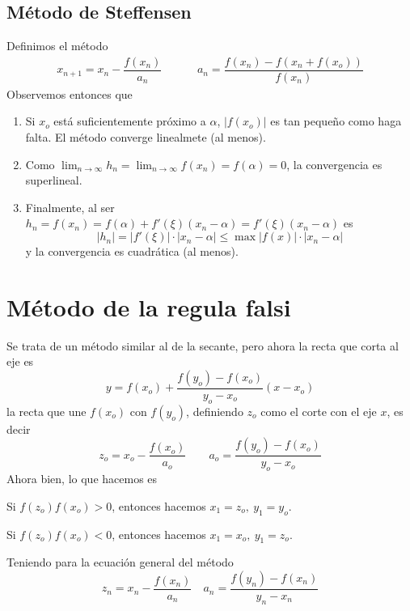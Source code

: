     \subsection{Método de Steffensen}
    \begin{met}
    Definimos el método
        \begin{align}
          x_{n+1}=x_n-\dfrac{f(x_n)}{a_n} \; \;\qquad \; \; a_n=\dfrac{f(x_n)-f(x_n+f(x_o))}{f(x_n)}
          \label{met:stef}
        \end{align}
        Observemos entonces que
        \begin{enumerate}
            \item Si $x_o$ está suficientemente próximo a $\alpha$, $|f(x_o)|$ es tan pequeño como haga falta. El método converge linealmete (al menos).
            \item Como $\displaystyle \lim_{n \to \infty} h_n = \lim_{n \to \infty} f(x_n)=f(\alpha)=0$, la convergencia es superlineal. 
            \item Finalmente, al ser $h_n=f(x_n)=f(\alpha)+f'(\xi)(x_n-\alpha)=f'(\xi)(x_n-\alpha)$ es 
            $$|h_n|=|f'(\xi)|\cdot |x_n-\alpha|\leq \max |f(x)|\cdot|x_n-\alpha|$$
            y la convergencia es cuadrática (al menos).
        \end{enumerate}
    \end{met}
    \section{M{\'e}todo de la regula falsi}
    \begin{met}
    Se trata de un método similar al de la secante, pero ahora la recta que corta al eje es
    $$y=f(x_o)+\dfrac{f(y_o)-f(x_o)}{y_o-x_o} (x-x_o)$$ 
    la recta que une $f(x_o)$ con $f(y_o)$, definiendo $z_o$ como el corte con el eje $x$, es decir
    $$z_o=x_o-\dfrac{f(x_o)}{a_o} \qquad a_o=\dfrac{f(y_o)-f(x_o)}{y_o-x_o}$$
    Ahora bien, lo que hacemos es

    Si $f(z_o) f(x_o) > 0$, entonces hacemos $x_1=z_o, \: y_1=y_o$.
    
    Si $f(z_o) f(x_o) < 0$, entonces hacemos $x_1=x_o, \: y_1=z_o$.
    
    Teniendo para la ecuación general del método
    $$z_n=x_n-\dfrac{f(x_n)}{a_n}  \quad a_n=\dfrac{f(y_n)-f(x_n)}{y_n-x_n}$$  
    \end{met}
    
